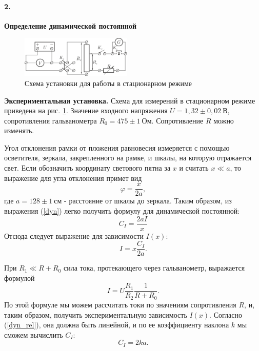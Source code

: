 \documentclass[12pt,a4paper]{article}
\begin{document}
\paragraph{\large 2.}\large\textbf{Определение динамической постоянной}\normalsize
\medskip

\begin{figure}
\centering\includegraphics[width = 0.47\textwidth]{Sch1}
\captionsetup{justification = centering}
\caption{Схема установки для работы в стационарном режиме \label{Fig2}}
\end{figure}
\textbf{Экспериментальная установка.} Схема для измерений в стационарном режиме приведена на рис. \ref{Fig2}. Значение входного напряжения $U = 1,32 \pm 0,02~\text{В}$, сопротивления гальванометра $R_0 = 475 \pm 1~\text{Ом}$. Сопротивление $R$ можно изменять.

Угол отклонения рамки от пложения равновесия измеряется с помощью осветителя, зеркала, закрепленного на рамке, и шкалы, на которую отражается свет. Если обозначить координату светового пятна за $x$ и считать $x \ll a$, то выражение для угла отклонения примет вид
\begin{equation}
\varphi = \frac{x}{2a},
\end{equation}
где $a = 128 \pm 1~\text{см}$ - расстояние от шкалы до зеркала. Таким образом, из выражения (\ref{dyn}) легко получить формулу для динамической постоянной:
\begin{equation}
C_I = \frac{2aI}{x} 
\end{equation}
Отсюда следует выражение для зависимости $I(x)$:
\begin{equation}
I = x\frac{C_I}{2a}\label{dyn_rel}.
\end{equation}

При $R_1 \ll R + R_0$ сила тока, протекающего через гальванометр, выражается формулой
\begin{equation}
I = U\frac{R_1}{R_2}\frac{1}{R + R_0}.
\end{equation}
По этой формуле мы можем рассчитать токи по значениям сопротивления $R$, и, таким образом, получить экспериментальную зависимость $I(x)$. Согласно (\ref{dyn_rel}), она должна быть линейной, и по ее коэффициенту наклона $k$ мы сможем вычислить $C_I$:
\begin{equation}
C_I = 2ka.
\end{equation}
\end{document}
